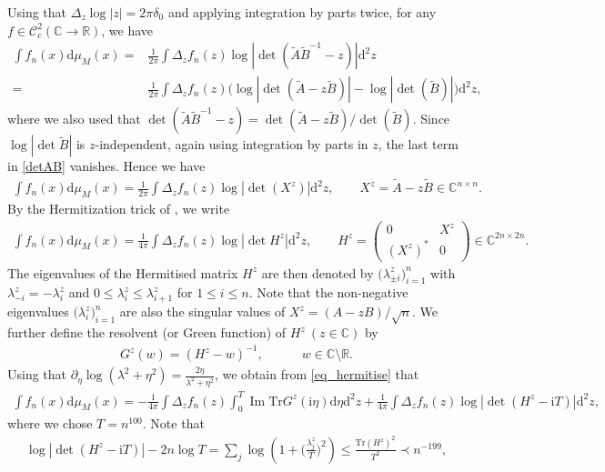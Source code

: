 \documentclass[10pt,reqno]{amsart}
\renewcommand{\Im}{\operatorname{Im}}
\newcommand{\R}{{\mathbb{R}}}
\newcommand{\C}{{\mathbb{C}}}
\newcommand{\A}{{\tilde{A}}}
\newcommand{\B}{{\tilde{B}}}
\newcommand{\dd}{\mathrm{d}}
\newcommand{\ii}{\mathrm{i}}
\newcommand{\<}{\langle}
\renewcommand{\>}{\rangle}
\numberwithin{equation}{section}
\begin{document}
Using that $\Delta_z \log |z|=2\pi\delta_0$ and applying integration by parts twice, for any $f\in \mathcal{C}^{2}_c(\C \rightarrow \R)$, we have
\begin{align}\label{detAB}
     \int f_n(x)\dd\mu_M(x)=&\frac{1}{2\pi}\int \Delta_z f_n(z) \log |\det (\A \B^{-1}-z)|\dd^2 z\nonumber\\
    =&\frac{1}{2\pi}\int \Delta_z f_n(z) \big(\log |\det (\A-z\B)|-\log |\det (\B)|\big)\dd^2 z,
\end{align}
where we also used that $\det(\A \B^{-1}-z)=\det(\A-z\B)/\det(\B)$. Since $\log |\det \B|$ is $z$-independent, again using integration by parts in $z$, the last term in \eqref{detAB} vanishes. Hence we have
\begin{align}\label{X}
	 \int f_n(x)\dd\mu_M(x)=\frac{1}{2\pi} \int \Delta_z f_n(z) \log |\det (X^z) |\dd^2 z, \qquad  X^z=\A-z \B \in \C^{n \times n}.
\end{align}
By the Hermitization trick of \cite{zbMATH03901742}, we write
\begin{align}\label{eq_hermitise}
     \int f_n(x)\dd\mu_M(x)=\frac{1}{4\pi} \int \Delta_z f_n(z) \log |\det H^{z}|\dd^2 z, \qquad  H^{z}=\begin{pmatrix}
		0  &   X^z \\
		(X^z)^*    & 0
	\end{pmatrix}  \in \C^{2n \times 2n}.
\end{align}
  The eigenvalues of the Hermitised matrix $H^{z}$ are then denoted by $\big(\lambda^{z}_{\pm i}\big)_{i=1}^n$ with $\lambda^{z}_{-i}=-\lambda^{z}_i$ and $0\leq \lambda^{z}_i \leq \lambda^{z}_{i+1}$ for $1\leq i\leq n$. Note that the non-negative eigenvalues $\big(\lambda^{z}_{ i}\big)_{i=1}^n$ are also the singular values of $X^z=(A-zB)/\sqrt{n}$.  We further define the resolvent (or Green function) of $H^{z}~(z\in \mathbb{C})$ by
\begin{align}\label{eq_resolvent}
G^{z}(w)=(H^{z}-w)^{-1}, \qquad \quad w \in \mathbb{C} \setminus \mathbb{R}.
\end{align}
Using that $\partial_\eta \log(\lambda^2+\eta^2)=\frac{2\eta}{\lambda^2+\eta^2}$, we obtain from \eqref{eq_hermitise} that
\begin{align}
     \int f_n(x)\dd\mu_M(x)=-\frac{1}{4\pi} \int \Delta_z f_n(z) \int_{0}^{T} \Im \mathrm{Tr} G^{z}(\ii \eta) \dd \eta \dd^2 z+\frac{1}{4\pi}  \int \Delta_z f_n(z) \log |\det (H^{z}-\ii T)|\dd^2 z,
\end{align}
where we chose $T=n^{100}$. Note that 
	\begin{align}
		\log |\det (H^{z}-\ii T)|-2n \log T= \sum_{j} \log \left( 1+\Big(\frac{\lambda_j^{z}}{T}\Big)^2\right) \leq \frac{\mathrm{Tr} (H^{z})^2}{T^2} \prec n^{-199},
	\end{align}
\end{document}
